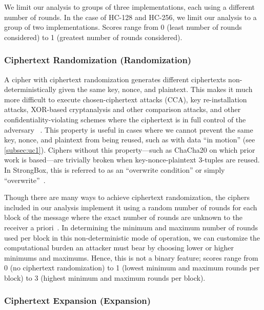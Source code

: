 We limit our analysis to groups of three implementations, each using a
different number of rounds. In the case of HC-128 and HC-256, we limit
our analysis to a group of two implementations. Scores range from 0
(least number of rounds considered) to 1 (greatest number of rounds
considered). 

\subsubsection{Ciphertext Randomization (Randomization)}

A cipher with ciphertext randomization generates different ciphertexts
non-deterministically given the same key, nonce, and plaintext. This makes it
much more difficult to execute chosen-ciphertext attacks (CCA), key
re-installation attacks, XOR-based cryptanalysis and other comparison attacks,
and other confidentiality-violating schemes where the ciphertext is in full
control of the adversary ~\cite{Freestyle}. This property is useful in cases
where we cannot prevent the same key, nonce, and plaintext from being reused,
such as with data ``in motion'' (see \cref{subsec:uc1}). Ciphers without this
property---such as ChaCha20 on which prior work is based---are trivially broken
when key-nonce-plaintext 3-tuples are reused. In StrongBox, this is referred to
as an ``overwrite condition'' or simply ``overwrite''~\cite{StrongBox}.

Though there are many ways to achieve ciphertext randomization, the
ciphers included in our analysis implement it using a random number of
rounds for each block of the message where the exact number of rounds
are unknown to the receiver a priori~\cite{Freestyle}. In determining
the minimum and maximum number of rounds used per block in this
non-deterministic mode of operation, we can customize the
computational burden an attacker must bear by choosing lower or higher
minimums and maximums. Hence, this is not a binary feature; scores
range from 0 (no ciphertext randomization) to 1 (lowest minimum and
maximum rounds per block) to 3 (highest minimum and maximum rounds per
block). 

\subsubsection{Ciphertext Expansion (Expansion)}

